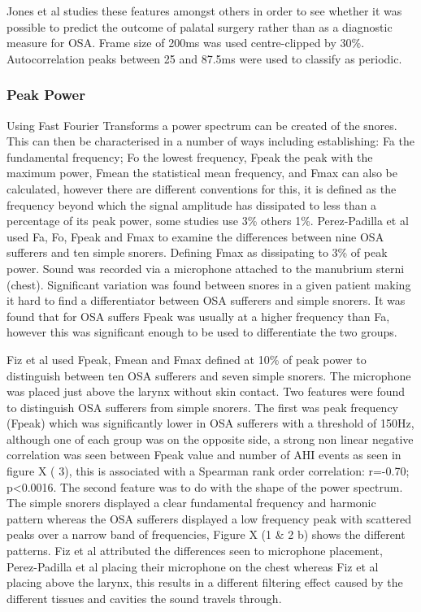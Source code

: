 Jones et al studies these features amongst others in order to see whether it was possible to predict the outcome of palatal surgery rather than as a diagnostic measure for OSA. Frame size of 200ms was used centre-clipped by 30\%. Autocorrelation peaks between 25 and 87.5ms were used to classify as periodic. 

\subsubsection{Peak Power}
Using Fast Fourier Transforms a power spectrum can be created of the snores. This can then be characterised in a number of ways including establishing: Fa the fundamental frequency; Fo the lowest frequency, Fpeak the peak with the maximum power, Fmean the statistical mean frequency, and Fmax can also be calculated, however there are different conventions for this, it is defined as the frequency beyond which the signal amplitude has dissipated to less than a percentage of its peak power, some studies use 3\% others 1\%. 
Perez-Padilla et al used Fa, Fo, Fpeak and Fmax to examine the differences between nine OSA sufferers and ten simple snorers. Defining Fmax as dissipating to 3\% of peak power. Sound was recorded via a microphone attached to the manubrium sterni (chest). Significant variation was found between snores in a given patient making it hard to find a differentiator between OSA sufferers and simple snorers. It was found that for OSA suffers Fpeak was usually at a higher frequency than Fa, however this was significant enough to be used to differentiate the two groups.

Fiz et al used Fpeak, Fmean and Fmax defined at 10\% of peak power to distinguish between ten OSA sufferers and seven simple snorers. The microphone was placed just above the larynx without skin contact. Two features were found to distinguish OSA sufferers from simple snorers. The first was peak frequency (Fpeak) which was significantly lower in OSA sufferers with a threshold of 150Hz, although one of each group was on the opposite side, a strong non linear negative correlation was seen between Fpeak value and number of AHI events as seen in figure X ( 3), this is associated with a Spearman rank order correlation: r=-0.70; p<0.0016. The second feature was to do with the shape of the power spectrum. The simple snorers displayed a clear fundamental frequency and harmonic pattern whereas the OSA sufferers displayed a low frequency peak with scattered peaks over a narrow band of frequencies, Figure X (1 \& 2 b) shows the different patterns. Fiz et al attributed the differences seen to microphone placement, Perez-Padilla et al placing their microphone on the chest whereas Fiz et al placing above the larynx, this results in a different filtering effect caused by the different tissues and cavities the sound travels through. 

